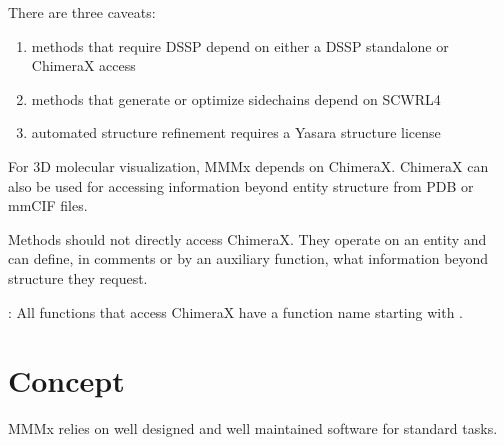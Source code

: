 \documentclass[letterpaper,10pt,english]{sphinxmanual}
\begin{document}
There are three caveats:
\begin{enumerate}
%
\item {} 
methods that require DSSP depend on either a DSSP standalone or ChimeraX access

\item {} 
methods that generate or optimize sidechains depend on SCWRL4

\item {} 
automated structure refinement requires a Yasara structure license

\end{enumerate}

For 3D molecular visualization, MMMx depends on ChimeraX. ChimeraX can also be used for accessing information beyond entity structure from PDB or mmCIF files.

Methods should not directly access ChimeraX. They operate on an entity and can define, in comments or by an auxiliary function, what information beyond structure they request.

: All functions that access ChimeraX have a function name starting with .


\chapter{Concept}
\label{\detokenize{concept:concept}}\label{\detokenize{concept::doc}}
MMMx relies on well designed and well maintained software for standard tasks.
\end{document}
